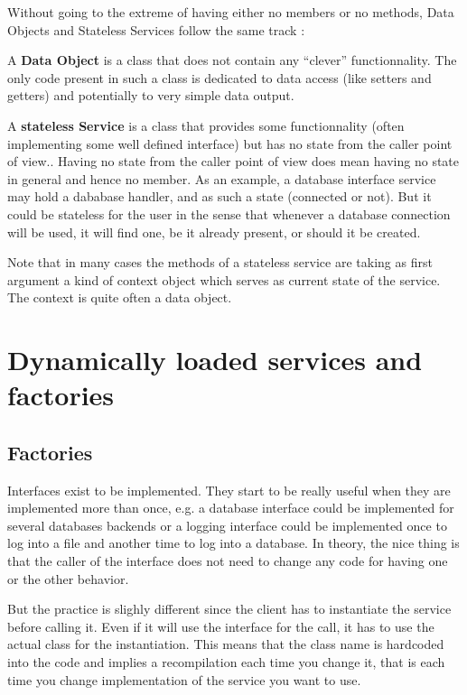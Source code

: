 Without going to the extreme of having either no members or no methods,
Data Objects and Stateless Services follow the same track :
\begin{description}
\item {A \bf Data Object} is a class that does not contain any ``clever''
functionnality. The only code present in such a class is dedicated
to data access (like setters and getters) and potentially to very
simple data output.
\item {A \bf stateless Service} is a class that provides some functionnality
(often implementing some well defined interface) but has no state from
the caller point of view..
Having no state from the caller point of view does mean having no state
in general and hence no member. As an example, a database interface
service may hold a dababase handler, and as such a state (connected or not).
But it could be stateless for the user in the sense that whenever
a database connection will be used, it will find one, be it already
present, or should it be created.
\end{description}

Note that in many cases the methods of a stateless service are taking
as first argument a kind of context object which serves as current state
of the service. The context is quite often a data object.


\section{Dynamically loaded services and factories}

\subsection {Factories}

Interfaces exist to be implemented. They start to be really useful
when they are implemented more than once, e.g. a database interface
could be implemented for several databases backends or a logging
interface could be implemented once to log into a file and another
time to log into a database. In theory, the nice thing is that the
caller of the interface does not need to change any code for having
one or the other behavior.

But the practice is slighly different since the client has to
instantiate the service before calling it.
Even if it will use the interface for the call, it has to use the
actual class for the instantiation. This means that the class name
is hardcoded into the code and implies a recompilation each time you
change it, that is each time you change implementation of the service
you want to use.

